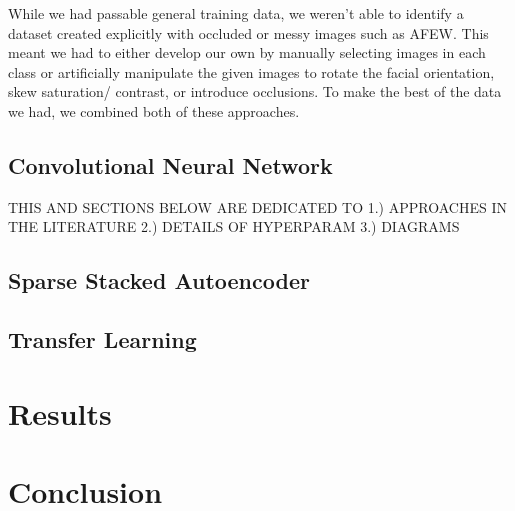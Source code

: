 \documentclass[conference]{IEEEtran}
\begin{document}
While we had passable general training data, we weren't able to identify a dataset created explicitly with occluded or messy images such as AFEW. This meant we had to either develop our own by manually selecting images in each class or artificially manipulate the given images to rotate the facial orientation, skew saturation/ contrast, or introduce occlusions. To make the best of the data we had, we combined both of these approaches. 

\subsection{Convolutional Neural Network}
THIS AND SECTIONS BELOW ARE DEDICATED TO 1.) APPROACHES IN THE LITERATURE 2.) DETAILS OF HYPERPARAM 3.) DIAGRAMS

\subsection{Sparse Stacked Autoencoder}

\subsection{Transfer Learning}

\section{Results}

\section{Conclusion}



\end{document}
